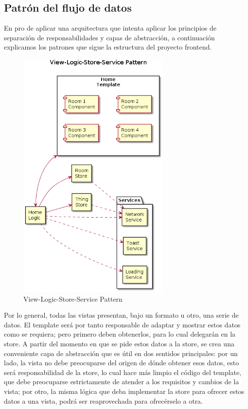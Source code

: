 \subsection{Patrón del flujo de datos}
\label{ch:Capitulo4.5.3}

En pro de aplicar una arquitectura que intenta aplicar los principios de separación de responsabilidades y capas de abstracción, a continuación explicamos los patrones que sigue la estructura del proyecto frontend.

\begin{figure}[hbt!]
\centering
\includegraphics[height=5in]{figures/diagrams/front/architecture/view-logic-store-service-pattern.png}
\caption[view-logic-store-service-pattern]{View-Logic-Store-Service Pattern\footnotemark}
\label{fig:front-view-store}
\end{figure}

\vspace{0.5cm}

Por lo general, todas las vistas presentan, bajo un formato u otro, una serie de datos. El template será por tanto responsable de adaptar y mostrar estos datos como se requiera; pero primero deben obtenerlos, para lo cual delegarán en la store. A partir del momento en que se pide estos datos a la store, se crea una conveniente capa de abstracción que es útil en dos sentidos principales: por un lado, la vista no debe preocuparse del origen de dónde obtener esos datos, esto será responsabilidad de la store, lo cual hace más limpio el código del template, que debe preocuparse estrictamente de atender a los requisitos y cambios de la vista; por otro, la misma lógica que deba implementar la store para ofrecer estos datos a una vista, podrá ser reaprovechada para ofrecérselo a otra. 

